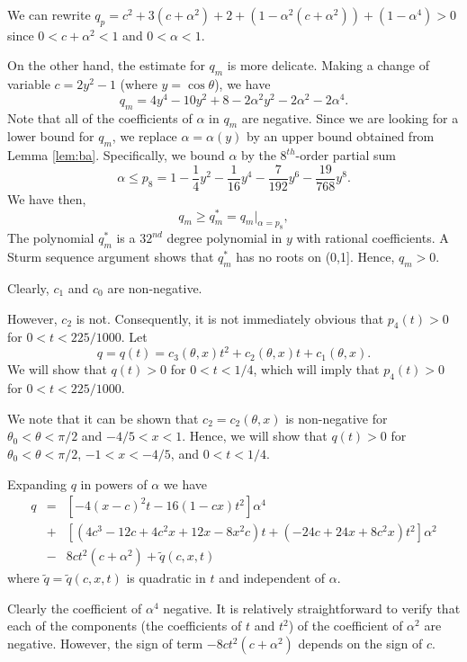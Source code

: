 \documentclass[12pt]{icgft}
\theoremstyle{definition}
\numberwithin{equation}{section}
\begin{document}
We can rewrite $q_p = c^2 + 3(c+\alpha^2) + 2 + (1 - \alpha^2(c+\alpha^2)) + (1-\alpha^4) > 0$ since $0 < c + \alpha^2 < 1$ and $0 < \alpha < 1$.

On the other hand, the estimate for $q_m$ is more delicate.  Making a change of variable $c = 2y^2-1$ (where $y = \cos \theta$), we have
$$q_m = 4y^4 -10y^2 + 8 -2\alpha^2y^2 - 2\alpha^2 - 2\alpha^4 .$$
Note that all of the coefficients of $\alpha$ in $q_m$ are negative.  Since we are looking for a lower bound for $q_m$, we replace $\alpha =
\alpha(y)$ by an upper bound obtained from Lemma \ref{lem:ba}.  Specifically, we bound $\alpha$ by the $8^{th}$-order partial sum
$$\alpha \le p_8 = 1 - \frac{1}{4}y^2 - \frac{1}{16}y^4 - \frac{7}{192}y^6
- \frac{19}{768}y^8 .$$
\noindent We have then,
$$q_m \ge q_m^* = {q_m}|_{\alpha=p_8},$$
\noindent The polynomial $q_m^*$ is a $32^{nd}$ degree polynomial in $y$ with rational coefficients.  A Sturm sequence argument shows that $q_m^*$ has no roots on (0,1].  Hence, $q_m > 0$.

Clearly, $c_1$ and $c_0$ are non-negative.

However, $c_2$ is not. Consequently, it is not immediately obvious that $p_4(t) > 0$ for $0 < t < 225/1000$.  Let
$$q = q(t) = c_3(\theta,x)t^2 + c_2(\theta,x)t + c_1(\theta,x). $$
\noindent We will show that $q(t) > 0$ for $0 < t < 1/4$, which will imply that
$p_4(t) > 0$ for $0 < t < 225/1000$.

We note that it can be shown that $c_2 = c_2(\theta,x)$ is non-negative for $\theta_0 < \theta < \pi/2$ and $-4/5 < x < 1$.  Hence, we will show that $q(t) > 0 $ for $\theta_0 < \theta < \pi/2$, $-1< x < -4/5$, and $0 < t < 1/4$.

Expanding $q$ in powers of $\alpha$ we have
\begin{eqnarray}
q &=& [-4(x-c)^2t - 16(1-cx)t^2]\alpha^4 \label{e:caseb} \\
&+& [(4c^3-12c+4c^2x+12x-8x^2c)t + (-24c + 24x + 8c^2 x)t^2]\alpha^2 \nonumber\\
&-&8ct^2(c+\alpha^2) + {\tilde q}(c,x,t) \nonumber
\end{eqnarray}
\noindent where ${\tilde q}= {\tilde q}(c,x,t)$ is quadratic in $t$ and independent of $\alpha$.

Clearly the coefficient of $\alpha^4$ negative.  It is relatively straightforward to verify that each of the components (the coefficients of $t$ and $t^2$) of the coefficient of $\alpha^2$ are negative.  However, the sign of term $-8ct^2(c+\alpha^2)$ depends on the sign of $c$.
\end{document}
